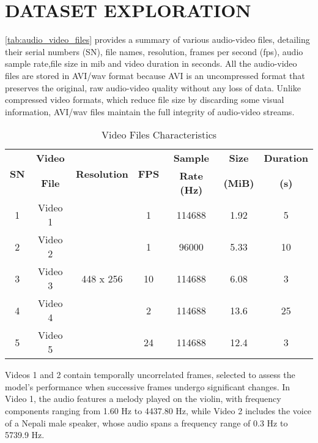 \section{\MakeUppercase{Dataset Exploration}}

\autoref{tab:audio_video_files} provides a summary of various audio-video files, detailing their serial numbers (SN), file names, resolution, frames per second (fps), audio sample rate,file size in \gls{mib} and video duration in seconds. All the audio-video files are stored in AVI/wav format because AVI is an uncompressed format that preserves the original, raw audio-video quality without any loss of data. Unlike compressed video formats, which reduce file size by discarding some visual information, AVI/wav files maintain the full integrity of audio-video streams.

\begin{table}[H]
    \centering
    \caption{Video Files Characteristics}
    \label{tab:audio_video_files}
    \begin{tabular}{|c|c|c|c|c|c|c|}
        \hline
        \multirow{2}{*}{\textbf{SN}} & \textbf{Video} & \multirow{2}{*}{\textbf{Resolution}} & \multirow{2}{*}{\textbf{FPS}} & \multicolumn{1}{c|}{\textbf{Sample}} & \multicolumn{1}{c|}{\textbf{Size}} & \multicolumn{1}{c|}{\textbf{Duration}} \\ 
        &\textbf{File} & & & \textbf{Rate (Hz)} & \textbf{(MiB)} & \textbf{(s)} \\ 
        \hline 
        1 & Video 1 & \multirow{5}{*}{448 x 256} & 1 & 114688 & 1.92 & 5 \\ 
        \cline{1-2} \cline{4-7}
        2 & Video 2 & & 1 & 96000 & 5.33 & 10 \\ 
        \cline{1-2} \cline{4-7}
        3 & Video 3 & & 10 & 114688 & 6.08 & 3 \\ 
        \cline{1-2} \cline{4-7}
        4 & Video 4 & & 2 & 114688 & 13.6 & 25 \\ 
        \cline{1-2} \cline{4-7}
        5 & Video 5 & & 24 & 114688 & 12.4 & 3 \\ 
        \hline
    \end{tabular}
\end{table}

Videos 1 and 2 contain temporally uncorrelated frames, selected to assess the model's performance when successive frames undergo significant changes. In Video 1, the audio features a melody played on the violin, with frequency components ranging from 1.60 Hz to 4437.80 Hz, while Video 2 includes the voice of a Nepali male speaker, whose audio spans a frequency range of 0.3 Hz to 5739.9 Hz.

